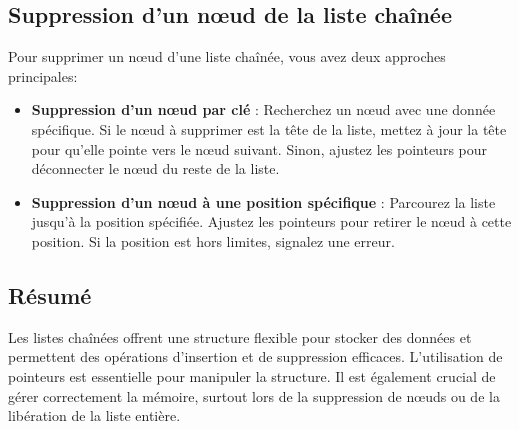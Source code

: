 \subsection{Suppression d'un nœud de la liste chaînée}

Pour supprimer un nœud d'une liste chaînée, vous avez deux approches principales:

\begin{itemize}
	\item \textbf{Suppression d'un nœud par clé} : Recherchez un nœud avec une donnée spécifique. Si le nœud à supprimer est la tête de la liste, mettez à jour la tête pour qu'elle pointe vers le nœud suivant. Sinon, ajustez les pointeurs pour déconnecter le nœud du reste de la liste.
	
	\item \textbf{Suppression d'un nœud à une position spécifique} : Parcourez la liste jusqu'à la position spécifiée. Ajustez les pointeurs pour retirer le nœud à cette position. Si la position est hors limites, signalez une erreur.
\end{itemize}

%

\subsection{Résumé}

Les listes chaînées offrent une structure flexible pour stocker des données et permettent des opérations d'insertion et de suppression efficaces. L'utilisation de pointeurs est essentielle pour manipuler la structure. Il est également crucial de gérer correctement la mémoire, surtout lors de la suppression de nœuds ou de la libération de la liste entière.



